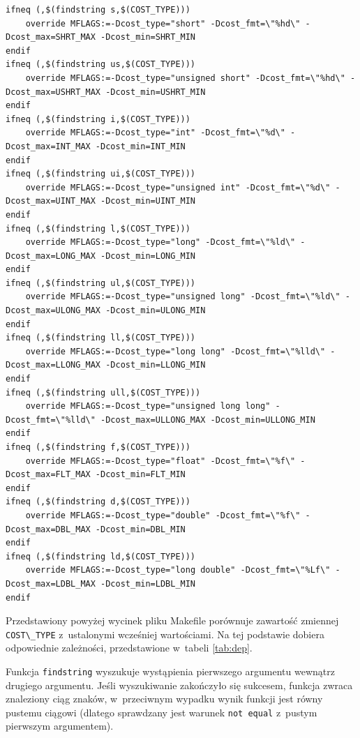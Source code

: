\documentclass[a4paper,12pt,polish,oneside]{thesis}
\newcommand\code[1]{\lstinline[style=line]{#1}}
\begin{document}
\begin{lstlisting}[style=code,caption=Makefile - blok decydujący o zmiennej cost]
ifneq (,$(findstring s,$(COST_TYPE)))
	override MFLAGS:=-Dcost_type="short" -Dcost_fmt=\"%hd\" -Dcost_max=SHRT_MAX -Dcost_min=SHRT_MIN
endif
ifneq (,$(findstring us,$(COST_TYPE)))
	override MFLAGS:=-Dcost_type="unsigned short" -Dcost_fmt=\"%hd\" -Dcost_max=USHRT_MAX -Dcost_min=USHRT_MIN
endif
ifneq (,$(findstring i,$(COST_TYPE)))
	override MFLAGS:=-Dcost_type="int" -Dcost_fmt=\"%d\" -Dcost_max=INT_MAX -Dcost_min=INT_MIN
endif
ifneq (,$(findstring ui,$(COST_TYPE)))
	override MFLAGS:=-Dcost_type="unsigned int" -Dcost_fmt=\"%d\" -Dcost_max=UINT_MAX -Dcost_min=UINT_MIN
endif
ifneq (,$(findstring l,$(COST_TYPE)))
	override MFLAGS:=-Dcost_type="long" -Dcost_fmt=\"%ld\" -Dcost_max=LONG_MAX -Dcost_min=LONG_MIN
endif
ifneq (,$(findstring ul,$(COST_TYPE)))
	override MFLAGS:=-Dcost_type="unsigned long" -Dcost_fmt=\"%ld\" -Dcost_max=ULONG_MAX -Dcost_min=ULONG_MIN
endif
ifneq (,$(findstring ll,$(COST_TYPE)))
	override MFLAGS:=-Dcost_type="long long" -Dcost_fmt=\"%lld\" -Dcost_max=LLONG_MAX -Dcost_min=LLONG_MIN
endif
ifneq (,$(findstring ull,$(COST_TYPE)))
	override MFLAGS:=-Dcost_type="unsigned long long" -Dcost_fmt=\"%lld\" -Dcost_max=ULLONG_MAX -Dcost_min=ULLONG_MIN
endif
ifneq (,$(findstring f,$(COST_TYPE)))
	override MFLAGS:=-Dcost_type="float" -Dcost_fmt=\"%f\" -Dcost_max=FLT_MAX -Dcost_min=FLT_MIN
endif
ifneq (,$(findstring d,$(COST_TYPE)))
	override MFLAGS:=-Dcost_type="double" -Dcost_fmt=\"%f\" -Dcost_max=DBL_MAX -Dcost_min=DBL_MIN
endif
ifneq (,$(findstring ld,$(COST_TYPE)))
	override MFLAGS:=-Dcost_type="long double" -Dcost_fmt=\"%Lf\" -Dcost_max=LDBL_MAX -Dcost_min=LDBL_MIN
endif
\end{lstlisting}

Przedstawiony powyżej wycinek pliku Makefile porównuje zawartość zmiennej \code{COST\_TYPE} z~ustalonymi wcześniej wartościami. Na tej podstawie dobiera odpowiednie zależności, przedstawione w~tabeli \ref{tab:dep}.

Funkcja \code{findstring} wyszukuje wystąpienia pierwszego argumentu wewnątrz drugiego argumentu.
Jeśli wyszukiwanie zakończyło się sukcesem, funkcja zwraca znaleziony ciąg znaków, w~przeciwnym wypadku wynik funkcji jest równy pustemu ciągowi (dlatego sprawdzany jest warunek \code{not equal} z~pustym pierwszym argumentem).
\end{document}
